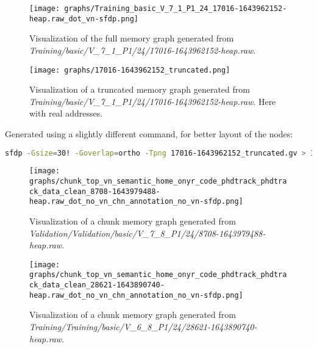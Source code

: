 \begin{figure}[H]\label{appendix:mem_graph:17016-1643962152:full}
    \centering
    \texttt{[image: graphs/Training\_basic\_V\_7\_1\_P1\_24\_17016-1643962152-heap.raw\_dot\_vn-sfdp.png]}
    \caption{Visualization of the full memory graph generated from \textit{Training/basic/V\_7\_1\_P1/24/17016-1643962152-heap.raw}.}
\end{figure}

\begin{figure}[H]\label{appendix:mem_graph:17016-1643962152:truncated}
    \centering
    \texttt{[image: graphs/17016-1643962152\_truncated.png]}
    \caption{Visualization of a truncated memory graph generated from \textit{Training/basic/V\_7\_1\_P1/24/17016-1643962152-heap.raw}. Here with real addresses.}
\end{figure}

Generated using a slightly different command, for better layout of the nodes:

\begin{lstlisting}[language=bash, caption={Command used to generate the memory graph visualization of \textit{Training/basic/V\_7\_1\_P1/24/17016-1643962152-heap.raw} here using real addresses.}]
    sfdp -Gsize=30! -Goverlap=ortho -Tpng 17016-1643962152_truncated.gv > 17016-1643962152_truncated.png
\end{lstlisting}

\begin{figure}[H]
    \centering
    \texttt{[image: graphs/chunk\_top\_vn\_semantic\_home\_onyr\_code\_phdtrack\_phdtrack\_data\_clean\_8708-1643979488-heap.raw\_dot\_no\_vn\_chn\_annotation\_no\_vn-sfdp.png]}
    \caption{Visualization of a chunk memory graph generated from \textit{Validation/Validation/basic/V\_7\_8\_P1/24/8708-1643979488-heap.raw}.}
\end{figure}

\begin{figure}[H]
    \centering
    \texttt{[image: graphs/chunk\_top\_vn\_semantic\_home\_onyr\_code\_phdtrack\_phdtrack\_data\_clean\_28621-1643890740-heap.raw\_dot\_no\_vn\_chn\_annotation\_no\_vn-sfdp.png]}
    \caption{Visualization of a chunk memory graph generated from \textit{Training/Training/basic/V\_6\_8\_P1/24/28621-1643890740-heap.raw}.}
\end{figure}